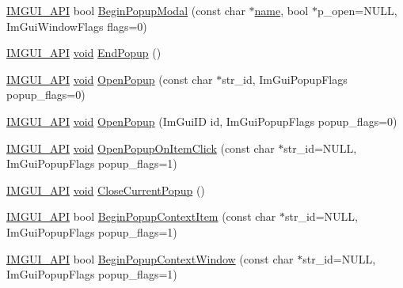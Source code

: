 \begin{DoxyCompactItemize}
\hyperlink{imgui_8h_a43829975e84e45d1149597467a14bbf5}{I\+M\+G\+U\+I\+\_\+\+A\+PI} bool \hyperlink{namespaceImGui_a6d840f615c198c2342968f733fda11b3}{Begin\+Popup\+Modal} (const char $\ast$\hyperlink{imgui__impl__opengl3__loader_8h_a5c4947d4516dd7cfa3505ce3a648a4ef}{name}, bool $\ast$p\+\_\+open=N\+U\+LL, Im\+Gui\+Window\+Flags flags=0)
\item 
\hyperlink{imgui_8h_a43829975e84e45d1149597467a14bbf5}{I\+M\+G\+U\+I\+\_\+\+A\+PI} \hyperlink{imgui__impl__opengl3__loader_8h_ac668e7cffd9e2e9cfee428b9b2f34fa7}{void} \hyperlink{namespaceImGui_aa6a9b5696f2ea7eed7683425fc77b8f2}{End\+Popup} ()
\item 
\hyperlink{imgui_8h_a43829975e84e45d1149597467a14bbf5}{I\+M\+G\+U\+I\+\_\+\+A\+PI} \hyperlink{imgui__impl__opengl3__loader_8h_ac668e7cffd9e2e9cfee428b9b2f34fa7}{void} \hyperlink{namespaceImGui_a9e1be94ca8c4d48a20b230cdfc9b18c5}{Open\+Popup} (const char $\ast$str\+\_\+id, Im\+Gui\+Popup\+Flags popup\+\_\+flags=0)
\item 
\hyperlink{imgui_8h_a43829975e84e45d1149597467a14bbf5}{I\+M\+G\+U\+I\+\_\+\+A\+PI} \hyperlink{imgui__impl__opengl3__loader_8h_ac668e7cffd9e2e9cfee428b9b2f34fa7}{void} \hyperlink{namespaceImGui_aa01aaa1d9002799e66094cfe87bf77a3}{Open\+Popup} (Im\+Gui\+ID id, Im\+Gui\+Popup\+Flags popup\+\_\+flags=0)
\item 
\hyperlink{imgui_8h_a43829975e84e45d1149597467a14bbf5}{I\+M\+G\+U\+I\+\_\+\+A\+PI} \hyperlink{imgui__impl__opengl3__loader_8h_ac668e7cffd9e2e9cfee428b9b2f34fa7}{void} \hyperlink{namespaceImGui_a3811834876930efd5cb08a25d8c022d0}{Open\+Popup\+On\+Item\+Click} (const char $\ast$str\+\_\+id=N\+U\+LL, Im\+Gui\+Popup\+Flags popup\+\_\+flags=1)
\item 
\hyperlink{imgui_8h_a43829975e84e45d1149597467a14bbf5}{I\+M\+G\+U\+I\+\_\+\+A\+PI} \hyperlink{imgui__impl__opengl3__loader_8h_ac668e7cffd9e2e9cfee428b9b2f34fa7}{void} \hyperlink{namespaceImGui_aeaec6479834db7918260fc082107f90b}{Close\+Current\+Popup} ()
\item 
\hyperlink{imgui_8h_a43829975e84e45d1149597467a14bbf5}{I\+M\+G\+U\+I\+\_\+\+A\+PI} bool \hyperlink{namespaceImGui_a440894c8c00495d5cc01529f4504fca9}{Begin\+Popup\+Context\+Item} (const char $\ast$str\+\_\+id=N\+U\+LL, Im\+Gui\+Popup\+Flags popup\+\_\+flags=1)
\item 
\hyperlink{imgui_8h_a43829975e84e45d1149597467a14bbf5}{I\+M\+G\+U\+I\+\_\+\+A\+PI} bool \hyperlink{namespaceImGui_aef8b2c0baa27bd5c68f676aaf14ed946}{Begin\+Popup\+Context\+Window} (const char $\ast$str\+\_\+id=N\+U\+LL, Im\+Gui\+Popup\+Flags popup\+\_\+flags=1)

\end{DoxyCompactItemize}
